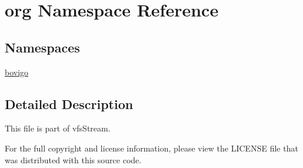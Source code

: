 \hypertarget{namespaceorg}{}\section{org Namespace Reference}
\label{namespaceorg}
\subsection*{Namespaces}
\begin{DoxyCompactItemize}
\item 
 \mbox{\hyperlink{namespaceorg_1_1bovigo}{bovigo}}
\end{DoxyCompactItemize}


\subsection{Detailed Description}
This file is part of vfs\+Stream.

For the full copyright and license information, please view the L\+I\+C\+E\+N\+SE file that was distributed with this source code.